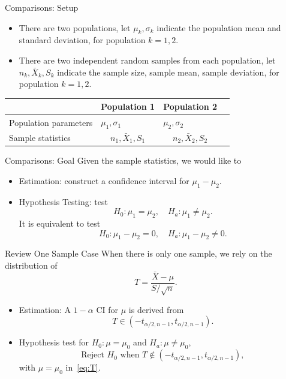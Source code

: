 \documentclass{beamer}
\begin{document}
\begin{frame}{Comparisons: Setup}
\begin{itemize}
\item There are two populations, let $\mu_k, \sigma_k$ indicate the population mean and standard deviation, for population $k=1,2$.
\item There are two independent random samples from each population, let $n_k, \bar X_k, S_k$ indicate the sample size, sample mean, sample deviation, for population $k=1,2$.
\end{itemize}
 \begin{table}
 \begin{center}
 \begin{tabular}{|M{3cm}|M{3cm}|M{3cm}|N}
 \hline
 & Population 1 & Population 2 \\ \hline
Population parameters & $ \mu_1, \sigma_1 $ & $\mu_2, \sigma_2$  \\\hline
Sample statistics & 
$$n_1,  \bar X_1, S_1$$ &
$$n_2,  \bar X_2, S_2$$ \\\hline
 \end{tabular}
 \end{center}
 \end{table}
 \end{frame}

\begin{frame}{Comparisons: Goal}
Given the sample statistics, we would like to 

\begin{itemize}
\item Estimation: construct a confidence interval for $\mu_1 - \mu_2$.
\item Hypothesis Testing: test 
$$H_0: \mu_1=\mu_2, \quad H_a: \mu_1 \ne \mu_2.$$
It is equivalent to test
$$H_0: \mu_1-\mu_2=0, \quad H_a: \mu_1 - \mu_2\ne 0.$$

\end{itemize}
 \end{frame}
 
\begin{frame}{Review One Sample Case}
When there is only one sample, we rely on the distribution of
\begin{equation}\label{eq:T}
T = \frac{\bar X - \mu}{S/\sqrt{n}}.
\end{equation}
\begin{itemize}
\item Estimation: A $1-\alpha$ CI for $\mu$ is derived from
$$T \in (-t_{\alpha/2,n-1},t_{\alpha/2,n-1}).$$
\item Hypothesis test  for $H_0: \mu=\mu_0$ and $H_a:\mu\ne\mu_0$,
$$\text{Reject $H_0$ when }T \not \in (-t_{\alpha/2,n-1},t_{\alpha/2,n-1}),$$
with $\mu=\mu_0$ in~\eqref{eq:T}.
\end{itemize}
\end{frame}
\end{document}

